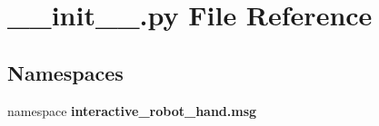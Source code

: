 \section{\-\_\-\-\_\-init\-\_\-\-\_\-.\-py File Reference}
\label{msg_2____init_____8py}
\subsection*{Namespaces}
\begin{DoxyCompactItemize}
\item 
namespace {\bf interactive\-\_\-robot\-\_\-hand.\-msg}
\end{DoxyCompactItemize}
